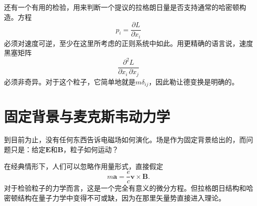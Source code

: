 还有一个有用的检验，用来判断一个提议的拉格朗日量是否支持通常的哈密顿构造。方程
\begin{equation}
  p_i=\frac{\partial L}{\partial\dot x_i}
\end{equation}
必须对速度可逆，至少在这里所考虑的正则系统中如此。用更精确的语言说，速度黑塞矩阵
\begin{equation}
  \frac{\partial^2L}
       {\partial\dot x_i\,\partial\dot x_j}
\end{equation}
必须非奇异。对于这个粒子，它简单地就是\(m\delta_{ij}\)，因此勒让德变换是明确的。

\begin{classroomqa}
\end{classroomqa}

\begin{classroomqa}
\end{classroomqa}

\section{固定背景与麦克斯韦动力学}

到目前为止，没有任何东西告诉电磁场如何演化。场是作为固定背景给出的，而问题只是：给定\(\mathbf E\)和\(\mathbf B\)，粒子如何运动？

\begin{classroomqa}
\end{classroomqa}

在经典情形下，人们可以忽略作用量形式，直接假定
\begin{equation}
  m\mathbf a=\frac{e}{c}\mathbf v\times\mathbf B.
\end{equation}
对于检验粒子的力学而言，这是一个完全有意义的微分方程。但拉格朗日结构和哈密顿结构在量子力学中变得不可或缺，因为在那里矢量势直接进入理论。

